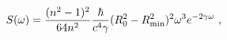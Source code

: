 \begin{equation}\label{sono2}
S(\omega)=\frac{(n^2-1)^2}{64n^2}\frac{\hbar}{c^4\gamma}(R_0^2-R_{\rm min}^2)^2\omega ^3e^{-2\gamma \omega}~,
\end{equation}

